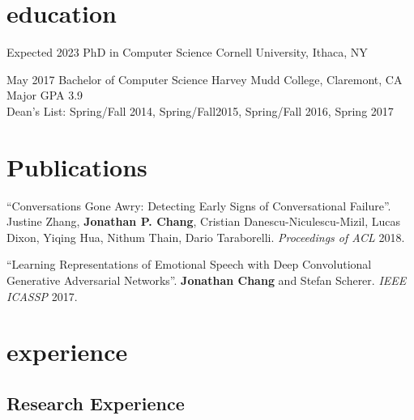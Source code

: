 \documentclass[]{friggeri-cv} %
\begin{document}
\section{education}

\begin{entrylist}


\entry
{Expected 2023}
{PhD {\normalfont in Computer Science}}
{Cornell University, Ithaca, NY}

\entry
{May 2017}
{Bachelor {\normalfont of Computer Science}}
{Harvey Mudd College, Claremont, CA}
{Major GPA 3.9 \\ Dean's List: Spring/Fall 2014, Spring/Fall2015, Spring/Fall 2016, Spring 2017}



\end{entrylist}


\section{Publications}

``Conversations Gone Awry: Detecting Early Signs of Conversational Failure''. Justine Zhang, \textbf{Jonathan P. Chang}, Cristian Danescu-Niculescu-Mizil, Lucas Dixon, Yiqing Hua, Nithum Thain, Dario Taraborelli. \emph{Proceedings of ACL} 2018. 

``Learning Representations of Emotional Speech with Deep
Convolutional Generative Adversarial Networks''. \textbf{Jonathan Chang} and
Stefan Scherer. \emph{IEEE ICASSP} 2017.

\vspace{0.1in}

\section{experience}

\subsection{Research Experience}
\end{document}

